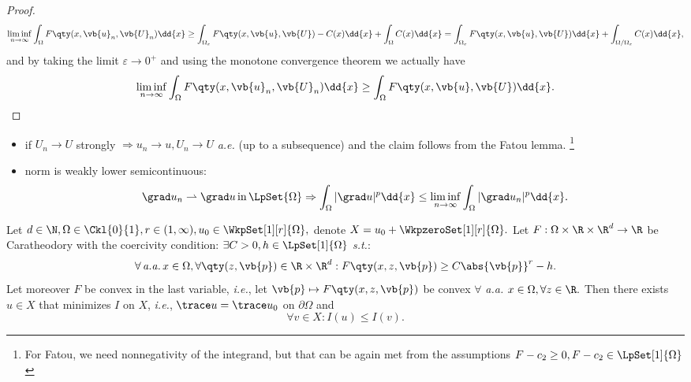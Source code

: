 \begin{proof}
	\[
		\liminf_{n\to \infty}\int_{\Omega}F\qty(x, \vb{u}_n, \vb{U}_n)\dd{x}\geq \int_{\Omega_{\varepsilon}}F\qty(x, \vb{u}, \vb{U})- C(x)\dd{x} + \int_{\Omega}C(x)\dd{x} = \int_{\Omega_{\varepsilon}}F\qty(x, \vb{u}, \vb{U})\dd{x} + \int_{\Omega / \Omega_{\varepsilon}}C(x)\dd{x},
	\]
	and by taking the limit $\varepsilon \to 0^+$ and using the monotone convergence theorem we actually have
	\[
		\liminf_{n \to \infty}\int_{\Omega}F\qty(x, \vb{u}_n, \vb{U}_n)\dd{x} \geq \int_{\Omega}F\qty(x, \vb{u}, \vb{U})\dd{x}.
	\]

\end{proof}
\begin{remark}
	\begin{itemize}
		\item if $U_n \to U$ strongly $\Rightarrow u_n \to u, U_n \to U$ \textit{a.e.} (up to a subsequence) and the claim follows from the Fatou lemma. \footnote{For Fatou, we need nonnegativity of the integrand, but that can be again met from the assumptions $F-c_2 \geq 0, F-c_2 \in \LpSet[1]{\Omega}$}
		\item norm is weakly lower semicontinuous:
			\[
				\grad u_n \rightharpoonup \grad u \, \text{in} \, \LpSet{\Omega} \Rightarrow \int_{\Omega}|\grad u|^p\dd{x} \leq \liminf_{n \to \infty} \int_{\Omega}|\grad u_n|^p\dd{x}.
			\]
	\end{itemize}
\end{remark}

\begin{theorem}
    Let $d \in \N, \Omega \in \Ckl{0}{1}, r \in (1, \infty), u_0 \in \WkpSet[1][r]{\Omega},$ denote $X = u_0 + \WkpzeroSet[1][r]{\Omega}.$ Let $F:\Omega \times \R \times \R^{d} \to \R$ be Caratheodory with the coercivity condition: $\exists C > 0, h \in \LpSet[1]{\Omega}$ \textit{s.t.}:
    \[
	    \forall \, \text{\textit{a.a.}} \, x \in \Omega, \forall \qty(z, \vb{p}) \in \R \times \R^{d}: F\qty(x,z,\vb{p}) \geq C\abs{\vb{p}}^r - h.
    \]
    Let moreover $F$ be convex in the last variable, \textit{i.e.}, let $\vb{p} \mapsto F\qty(x, z, \vb{p})$ be convex $\forall$ \textit{a.a.} $x\in \Omega, \forall z \in \R.$ Then there exists $u \in X$ that minimizes $I$ on $X$, \textit{i.e.}, $\trace u = \trace u_0$ on $\partial \Omega$ and
    \[
	    \forall v \in X: I(u) \leq I(v).
    \]
\end{theorem}

